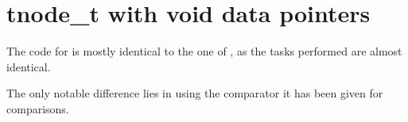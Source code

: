 \section{tnode\_t with void data pointers}

The code for  is mostly identical to the one of ,
as the tasks performed are almost identical.

The only notable difference lies in using the comparator it has been given for
comparisons.
